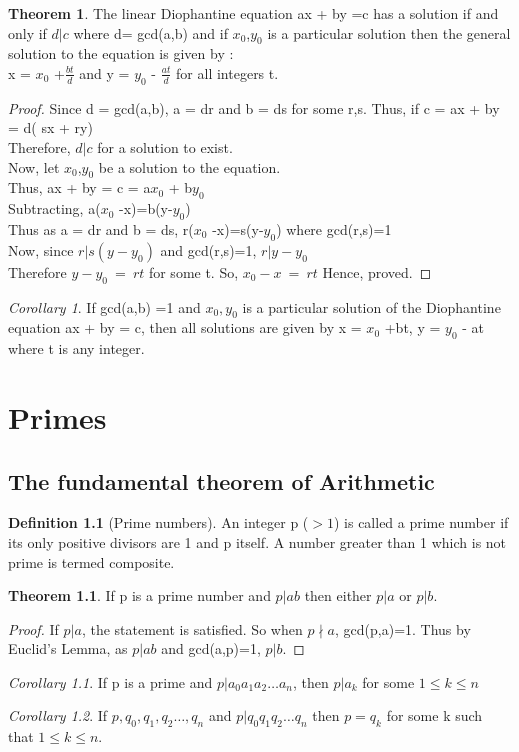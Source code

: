 \documentclass[15,a4paper]{report}
\theoremstyle{definition}
\newtheorem{definition}{Definition}[section]
\newtheorem{theorem}{Theorem}[section]
\theoremstyle{remark}
\newtheorem{corollary}{Corollary}[theorem]
\begin{document}
\begin{theorem}
    The linear Diophantine equation ax + by =c has a solution if and only if $d|c$ where d= gcd(a,b) and if $x_0$,$y_0$ is a particular solution then the general solution to the equation is given by :\\
    x = $x_0$ +$\frac{bt}{d}$ and y = $y_0$ - $\frac{at}{d}$ for all integers t.
\end{theorem}
\begin{proof}
    Since d = gcd(a,b), a = dr and b = ds for some r,s.
    Thus, if c = ax + by = d( sx + ry)\\
    Therefore, $d|c$ for a solution to exist.\\
    Now, let $x_0$,$y_0$ be a solution to the equation.\\
    Thus, ax + by = c = a$x_0$ + b$y_0$\\
    Subtracting, a($x_0$ -x)=b(y-$y_0$)\\
    Thus as a = dr and b = ds, r($x_0$ -x)=s(y-$y_0$) where gcd(r,s)=1\\
    Now, since $r|s(y-y_0)$ and gcd(r,s)=1, $r|y-y_0$\\
    Therefore $y-y_0 ~=~ rt$ for some t. So, $x_0 -x ~=~ rt$
    Hence, proved.
\end{proof}
\begin{corollary}
    If gcd(a,b) =1 and $x_0,y_0$ is a particular solution of the Diophantine equation ax + by = c, then all solutions are given by x = $x_0$ +bt, y = $y_0$ - at where t is any integer.
\end{corollary}



\chapter{Primes}
\section{The fundamental theorem of Arithmetic}
\begin{definition}[Prime numbers]
    An integer p ($>1$) is called a prime number if its only positive divisors are 1 and p itself. A number greater than 1 which is not prime is termed composite. 
\end{definition}
\begin{theorem}
    If p is a prime number and $p|ab$ then either $p|a$ or $p|b$.
\end{theorem}
\begin{proof}
    If $p|a$, the statement is satisfied. So when $p \nmid a$, gcd(p,a)=1. Thus by Euclid's Lemma, as $p|ab$ and gcd(a,p)=1, $p|b$.
\end{proof}
\begin{corollary}
    If p is a prime and $p|a_0a_1a_2 \dots a_n$, then $p|a_k$ for some $1 \leq k \leq n$
\end{corollary}
\begin{corollary}
    If $p,q_0,q_1,q_2\dots ,q_n$ and $p|q_0q_1q_2\dots q_n$ then $p=q_k$ for some k such that $1\leq k \leq n$.
\end{corollary}
\end{document}
